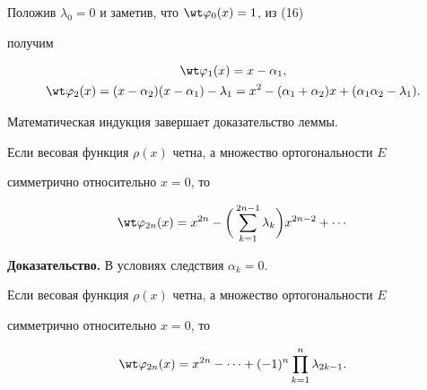  


\begin{pf} 


Положив $\lambda_0=0$ и заметив, что $\wt\varphi_0(x)=1$, из (16) 


получим 


\begin{gather*} 


\wt\varphi_1(x)=x-\alpha_1,\\ 


\wt\varphi_2(x)=(x-\alpha_2)(x-\alpha_1)-\lambda_1= 


x^2-(\alpha_1+\alpha_2)x+(\alpha_1\alpha_2-\lambda_1). 


\end{gather*} 


Математическая индукция завершает доказательство леммы. 


\end{pf} 


 


\begin{cornonum} 


Если весовая функция $\rho(x)$ четна, а множество ортогональности $E$ 


симметрично относительно $x=0$, то 


$$ 


\wt\varphi_{2n}(x)=x^{2n}-\bigg(\sum^{2n-1}_{k=1}\lambda_k\bigg) 


x^{2n-2}+\dotsb 


$$ 


\end{cornonum} 


 


{\bf Доказательство.} В условиях следствия $\alpha_k=0$. 


 


\begin{lem} 


Если весовая функция $\rho(x)$ четна, а множество ортогональности $E$ 


симметрично относительно $x=0$, то 


$$ 


\wt\varphi_{2n}(x)=x^{2n}-\dotsb+(-1)^n 


\prod^n_{k=1}\lambda_{2k-1}. 


$$ 


\end{lem} 


